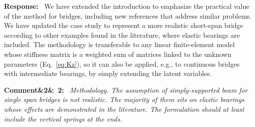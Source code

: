 \documentclass[11pt]{article}
\newenvironment{rcomment}[1]{\par\bigskip\noindent\textbf{Comment\ifx&#1&\else\ #1\fi:}\ \itshape}{\par}
\newenvironment{response}{\par\smallskip\noindent\color{resp}\textbf{Response:}\ }{\par}
\newenvironment{action}{\par\smallskip\noindent\color{resp}\textbf{Action:}\ }{\par}
\newcommand{\authornote}[1]{\textcolor{note}{\textsf{[Authors: #1]}}}
\newcommand{\tbd}[1]{\textcolor{note}{\textsf{[#1]}}}
\newcommand{\lines}[1]{\tbd{lines #1}}
\begin{document}
\begin{response}
We have extended the introduction to emphasize the practical value of the method for bridges, including new references that address similar problems. 
We have updated the case study to represent a more realistic short-span bridge according to other examples found in the literature, where elastic bearings are included. 
The methodology is transferable to any linear finite-element model whose stiffness matrix is a weighted sum of matrices linked to the unknown parameters (Eq.~\eqref{eq:Kz}), so it can also be applied, e.g., to continuous bridges with intermediate bearings, by simply extending the latent variables.

\end{response}
%

\begin{rcomment}{2}
Methodology. The assumption of simply-supported beam for single span bridges is not realistic. 
The majority of them sits on elastic bearings whose effects are demonstrated in the literature. 
The formulation should at least include the vertical springs at the ends.
\end{rcomment}
\end{document}
